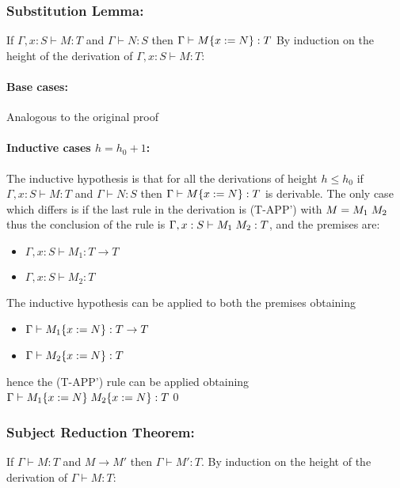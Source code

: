 \subsubsection*{Substitution Lemma:}

If $\Gamma, x: S \vdash M: T$ and $\Gamma \vdash N: S$ then $\Gamma \vdash M\{x:=N\}: T$
By induction on the height of the derivation of $\Gamma, x: S \vdash M: T$:

\paragraph*{Base cases:\\}
Analogous to the original proof

\paragraph*{Inductive cases $h = h_0 + 1$:\\}

The inductive hypothesis is that for all the derivations of height $h \le h_0$ if
$\Gamma, x: S \vdash M: T$ and $\Gamma \vdash N: S$ then $\Gamma \vdash M\{x:=N\}: T$
is derivable.
The only case which differs is if the last rule in the derivation is (T-APP') with
$M = M_1\;M_2$ thus the conclusion of the rule is $\Gamma, x: S \vdash M_1\;M_2: T$,
and the premises are:
\begin{itemize}
	\item $\Gamma, x: S \vdash M_1 : T \to T$
	\item $\Gamma, x: S \vdash M_2: T$
\end{itemize}

The inductive hypothesis can be applied to both the premises obtaining
\begin{itemize}
	\item $\Gamma \vdash M_1\{x:=N\}: T \to T$
	\item $\Gamma \vdash M_2\{x:=N\}: T$
\end{itemize}
hence the (T-APP') rule can be applied obtaining
$\Gamma \vdash M_1\{x:=N\}\;M_2\{x:=N\}: T$\qed

\subsubsection*{Subject Reduction Theorem:}

If $\Gamma \vdash M: T$ and $M \to M'$ then $\Gamma \vdash M': T$.
By induction on the height of the derivation of $\Gamma \vdash M: T$:

